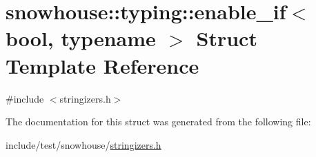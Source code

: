 \hypertarget{structsnowhouse_1_1typing_1_1enable__if}{}\section{snowhouse\+::typing\+::enable\+\_\+if$<$ bool, typename $>$ Struct Template Reference}
\label{structsnowhouse_1_1typing_1_1enable__if}


{\ttfamily \#include $<$stringizers.\+h$>$}



The documentation for this struct was generated from the following file\+:\begin{DoxyCompactItemize}
\item 
include/test/snowhouse/\mbox{\hyperlink{stringizers_8h}{stringizers.\+h}}\end{DoxyCompactItemize}
